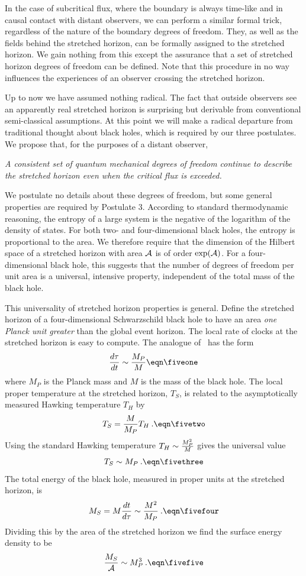 In the case of subcritical flux, where the boundary is always
time-like and in causal contact with distant observers, we can
perform a similar formal trick, regardless of the nature of the
boundary degrees of freedom.  They, as well as the fields behind the
stretched horizon, can be formally assigned to the stretched horizon.
 We gain nothing from this except the assurance that a set of
stretched horizon degrees of freedom can be defined.  Note that this
procedure in no way influences the experiences of an observer
crossing the stretched horizon.

Up to now we have assumed nothing radical.  The fact that outside
observers see an apparently real stretched horizon is surprising but
derivable from conventional semi-classical assumptions.  At this
point we will make a radical departure from traditional thought about
black holes, which is required by our three postulates.  We propose
that, for the purposes of a distant observer,

{\it A consistent set of quantum mechanical degrees of freedom
continue to describe the stretched horizon even when the critical
flux is exceeded.}

We postulate no details about these degrees of freedom, but some
general properties are required by Postulate 3.  According to
standard thermodynamic reasoning, the entropy of a large system is
the negative of the logarithm of the density of states.  For both
two- and four-dimensional black holes, the entropy is proportional to
the area.  We therefore require that the dimension of the Hilbert
space of a stretched horizon with area ${\cal A}$ is of order
$\exp({\cal A})$.  For a four-dimensional black hole, this suggests
that the number of degrees of freedom per unit area is a universal,
intensive property, independent of the total mass of the black hole.

This universality of stretched horizon properties is general.  Define
the stretched horizon of a four-dimensional Schwarzschild black hole
to have an area {\it one Planck unit greater\/} than the global event
horizon.  The local rate of clocks at the stretched horizon is easy
to compute.  The analogue of \threeone\ has the form
$$
{d\tau \over dt} \sim {M_P \over M}
\eqn\fiveone
$$
where $M_P$ is the Planck mass and $M$ is the mass of the black hole.
 The local proper temperature at the stretched horizon, $T_S$, is
related to the asymptotically measured Hawking temperature $T_H$ by
$$
T_S = {M \over M_P} T_H \>.
\eqn\fivetwo
$$
Using the standard Hawking temperature $T_H \sim {M_P^2\over M}$
gives the universal value
$$
T_S \sim M_P \>.
\eqn\fivethree
$$
The total energy of the black hole, measured in proper units at the
stretched horizon, is
$$
M_S = M {dt \over d\tau} \sim {M^2 \over M_P} \>.
\eqn\fivefour
$$
Dividing this by the area of the stretched horizon we find the
surface energy density to be
$$
{M_S \over {\cal A}} \sim M_P^3 \>.
\eqn\fivefive
$$

